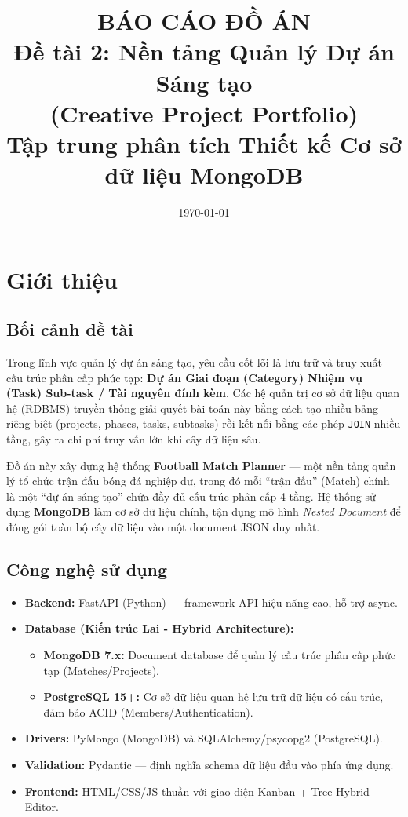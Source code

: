 \documentclass[a4paper,12pt]{article}
\title{\textbf{BÁO CÁO ĐỒ ÁN}\\[0.3cm]\Large Đề tài 2: Nền tảng Quản lý Dự án Sáng tạo\\(Creative Project Portfolio)\\[0.5cm]\large Tập trung phân tích Thiết kế Cơ sở dữ liệu MongoDB}
\author{}
\date{\today}
\begin{document}
\maketitle
\tableofcontents
\newpage

\section{Giới thiệu}

\subsection{Bối cảnh đề tài}
Trong lĩnh vực quản lý dự án sáng tạo, yêu cầu cốt lõi là lưu trữ và truy xuất cấu trúc phân cấp phức tạp: \textbf{Dự án {\textrightarrow} Giai đoạn (Category) {\textrightarrow} Nhiệm vụ (Task) {\textrightarrow} Sub-task / Tài nguyên đính kèm}. Các hệ quản trị cơ sở dữ liệu quan hệ (RDBMS) truyền thống giải quyết bài toán này bằng cách tạo nhiều bảng riêng biệt (projects, phases, tasks, subtasks) rồi kết nối bằng các phép \texttt{JOIN} nhiều tầng, gây ra chi phí truy vấn lớn khi cây dữ liệu sâu.

Đồ án này xây dựng hệ thống \textbf{Football Match Planner} --- một nền tảng quản lý tổ chức trận đấu bóng đá nghiệp dư, trong đó mỗi ``trận đấu'' (Match) chính là một ``dự án sáng tạo'' chứa đầy đủ cấu trúc phân cấp 4 tầng. Hệ thống sử dụng \textbf{MongoDB} làm cơ sở dữ liệu chính, tận dụng mô hình \textit{Nested Document} để đóng gói toàn bộ cây dữ liệu vào một document JSON duy nhất.

\subsection{Công nghệ sử dụng}
\begin{itemize}
    \item \textbf{Backend:} FastAPI (Python) --- framework API hiệu năng cao, hỗ trợ async.
    \item \textbf{Database (Kiến trúc Lai - Hybrid Architecture):} 
    \begin{itemize}
        \item \textbf{MongoDB 7.x:} Document database để quản lý cấu trúc phân cấp phức tạp (Matches/Projects).
        \item \textbf{PostgreSQL 15+:} Cơ sở dữ liệu quan hệ lưu trữ dữ liệu có cấu trúc, đảm bảo ACID (Members/Authentication).
    \end{itemize}
    \item \textbf{Drivers:} PyMongo (MongoDB) và SQLAlchemy/psycopg2 (PostgreSQL).
    \item \textbf{Validation:} Pydantic --- định nghĩa schema dữ liệu đầu vào phía ứng dụng.
    \item \textbf{Frontend:} HTML/CSS/JS thuần với giao diện Kanban + Tree Hybrid Editor.
\end{itemize}
\end{document}
